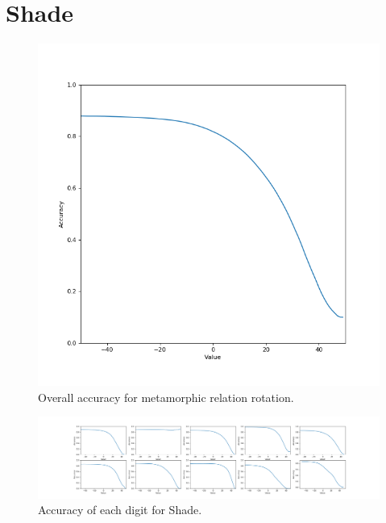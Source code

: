 \section{Shade}
        \begin{figure}[!htb]
            \begin{center}
              \includegraphics[scale=0.6]{chapters/results/CNN/Shade/acc.png}
              \caption{Overall accuracy for metamorphic relation rotation.}
              \label{fig:Shade 1}
            \end{center}
        \end{figure}
    
    \clearpage
        \begin{figure}[!htb]
        \centering
          \includegraphics[scale=0.4]{chapters/results/CNN/Shade/accAll.png}
          \caption{Accuracy of each digit for Shade.}
          \label{fig: Shading}
        \end{figure}
        
